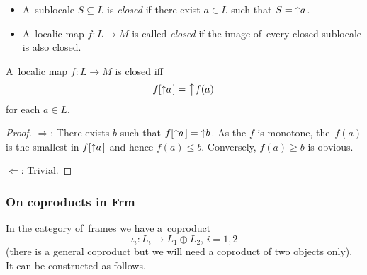 \begin{itemize}
\item A~sublocale $S \subseteq L$ is \emph{closed\/} if there exist $a\in L$
such that $S = \left\uparrow a\right.$.


\item A~localic map $f\colon L \to M$ is called \emph{closed\/} if the image
of~every closed sublocale is also closed.
\end{itemize}

\begin{prop} \label{prop:closed-map-char}
  A~localic map $f\colon L \to M$ is closed iff
  \[
    f[ \left\uparrow a\right. ] = \left\uparrow f(a)\right.
  \]
  for each $a\in L$.
\end{prop}
\begin{proof}
  $\Rightarrow$:
  There exists $b$ such that $f[ \left\uparrow a\right. ] = \left\uparrow
  b\right.$.
  As the $f$ is monotone, the~$f(a)$ is the smallest in $f[ \left\uparrow
  a\right. ]$ and hence $f(a) \le b$.
  Conversely, $f(a) \ge b$ is obvious.

  $\Leftarrow$:
  Trivial.
\end{proof}

\subsubsection*{On coproducts in Frm}

In the category of~frames we have a~coproduct
\[
  \iota_i: L_i \to L_1 \oplus L_2, \, i = 1, 2
\]
(there is a general coproduct but we will need a coproduct of two objects
 only).
It can be constructed as follows.

